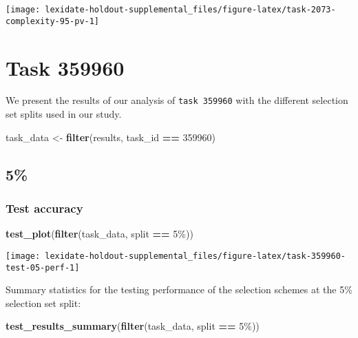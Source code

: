 \documentclass[
]{book}
\newenvironment{Shaded}{\begin{snugshade}}{\end{snugshade}}
\newcommand{\DecValTok}[1]{\textcolor[rgb]{0.00,0.00,0.81}{#1}}
\newcommand{\FunctionTok}[1]{\textcolor[rgb]{0.13,0.29,0.53}{\textbf{#1}}}
\newcommand{\NormalTok}[1]{#1}
\newcommand{\OtherTok}[1]{\textcolor[rgb]{0.56,0.35,0.01}{#1}}
\newcommand{\SpecialCharTok}[1]{\textcolor[rgb]{0.81,0.36,0.00}{\textbf{#1}}}
\newcommand{\StringTok}[1]{\textcolor[rgb]{0.31,0.60,0.02}{#1}}
\begin{document}
\texttt{[image: lexidate-holdout-supplemental\_files/figure-latex/task-2073-complexity-95-pv-1]}

\hypertarget{task-359960}{%
\chapter{Task 359960}\label{task-359960}}

We present the results of our analysis of \texttt{task\ 359960} with the different selection set splits used in our study.

\begin{Shaded}
\begin{Highlighting}[]
\NormalTok{task\_data }\OtherTok{\textless{}{-}} \FunctionTok{filter}\NormalTok{(results, task\_id }\SpecialCharTok{==} \DecValTok{359960}\NormalTok{)}
\end{Highlighting}
\end{Shaded}

\hypertarget{section-45}{%
\section{5\%}\label{section-45}}

\hypertarget{test-accuracy-45}{%
\subsection{Test accuracy}\label{test-accuracy-45}}

\begin{Shaded}
\begin{Highlighting}[]
\FunctionTok{test\_plot}\NormalTok{(}\FunctionTok{filter}\NormalTok{(task\_data, split }\SpecialCharTok{==} \StringTok{\textquotesingle{}5\%\textquotesingle{}}\NormalTok{))}
\end{Highlighting}
\end{Shaded}

\texttt{[image: lexidate-holdout-supplemental\_files/figure-latex/task-359960-test-05-perf-1]}

Summary statistics for the testing performance of the selection schemes at the 5\% selection set split:

\begin{Shaded}
\begin{Highlighting}[]
\FunctionTok{test\_results\_summary}\NormalTok{(}\FunctionTok{filter}\NormalTok{(task\_data, split }\SpecialCharTok{==} \StringTok{\textquotesingle{}5\%\textquotesingle{}}\NormalTok{))}
\end{Highlighting}
\end{Shaded}
\end{document}
